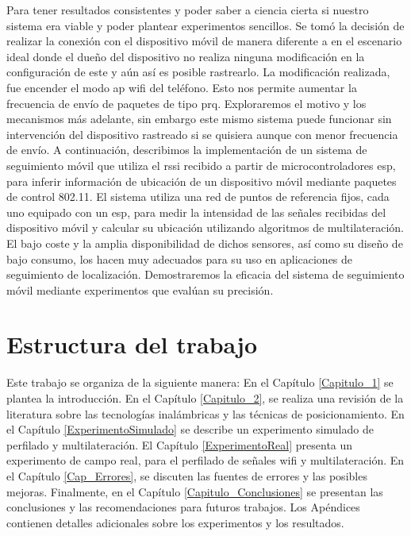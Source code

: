 Para tener resultados consistentes y poder saber a ciencia cierta si nuestro sistema era viable y poder plantear experimentos sencillos. Se tomó la decisión de realizar la conexión con el dispositivo móvil de manera diferente a en el escenario ideal donde el dueño del dispositivo no realiza ninguna modificación en la configuración de este y aún así es posible rastrearlo. La modificación realizada, fue encender el modo \acs{ap} \acs{wifi} del teléfono. Esto nos permite aumentar la frecuencia de envío de paquetes de tipo \acl{prq}. Exploraremos el motivo y los mecanismos más adelante, sin embargo este mismo sistema puede funcionar sin intervención del dispositivo rastreado si se quisiera aunque con menor frecuencia de envío.
\newline
A continuación, describimos la implementación de un sistema de seguimiento móvil que utiliza el \acs{rssi} recibido a partir de microcontroladores \acs{esp}, para inferir información de ubicación de un dispositivo móvil mediante paquetes de control 802.11. El sistema utiliza una red de puntos de referencia fijos, cada uno equipado con un \acs{esp}, para medir la intensidad de las señales recibidas del dispositivo móvil y calcular su ubicación utilizando algoritmos de multilateración. El bajo coste y la amplia disponibilidad de dichos sensores, así como su diseño de bajo consumo, los hacen muy adecuados para su uso en aplicaciones de seguimiento de localización. Demostraremos la eficacia del sistema de seguimiento móvil mediante experimentos que evalúan su precisión.

\section{Estructura del trabajo}
Este trabajo se organiza de la siguiente manera: En el Capítulo \ref{Capitulo_1} se plantea la introducción. En el Capítulo \ref{Capitulo_2}, se realiza una revisión de la literatura sobre las tecnologías inalámbricas y las técnicas de posicionamiento. En el Capítulo \ref{ExperimentoSimulado} se describe un experimento simulado de perfilado y multilateración. El Capítulo \ref{ExperimentoReal} presenta un experimento de campo real, para el perfilado de señales \acs{wifi} y multilateración. En el Capítulo \ref{Cap_Errores}, se discuten las fuentes de errores y las posibles mejoras. Finalmente, en el Capítulo \ref{Capitulo_Conclusiones} se presentan las conclusiones y las recomendaciones para futuros trabajos. Los Apéndices contienen detalles adicionales sobre los experimentos y los resultados.